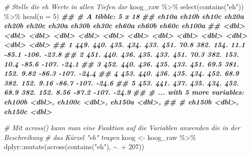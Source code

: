 \documentclass[
]{article}
\newenvironment{Shaded}{\begin{snugshade}}{\end{snugshade}}
\newcommand{\AttributeTok}[1]{\textcolor[rgb]{0.77,0.63,0.00}{#1}}
\newcommand{\CommentTok}[1]{\textcolor[rgb]{0.56,0.35,0.01}{\textit{#1}}}
\newcommand{\DecValTok}[1]{\textcolor[rgb]{0.00,0.00,0.81}{#1}}
\newcommand{\DocumentationTok}[1]{\textcolor[rgb]{0.56,0.35,0.01}{\textbf{\textit{#1}}}}
\newcommand{\FunctionTok}[1]{\textcolor[rgb]{0.00,0.00,0.00}{#1}}
\newcommand{\NormalTok}[1]{#1}
\newcommand{\OtherTok}[1]{\textcolor[rgb]{0.56,0.35,0.01}{#1}}
\newcommand{\SpecialCharTok}[1]{\textcolor[rgb]{0.00,0.00,0.00}{#1}}
\newcommand{\StringTok}[1]{\textcolor[rgb]{0.31,0.60,0.02}{#1}}
\begin{document}
\begin{Shaded}
\begin{Highlighting}[]
\CommentTok{\# Stelle die eh Werte in allen Tiefen dar}
\NormalTok{koog\_raw }\SpecialCharTok{\%\textgreater{}\%}
  \FunctionTok{select}\NormalTok{(}\FunctionTok{contains}\NormalTok{(}\StringTok{"eh"}\NormalTok{)) }\SpecialCharTok{\%\textgreater{}\%}
  \FunctionTok{head}\NormalTok{(}\AttributeTok{n =} \DecValTok{5}\NormalTok{)}
\DocumentationTok{\#\# \# A tibble: 5 x 18}
\DocumentationTok{\#\#   eh10a eh10b eh10c eh20a eh20b eh20c eh30a eh30b eh30c eh60a eh60b eh60c eh100a}
\DocumentationTok{\#\#   \textless{}dbl\textgreater{} \textless{}dbl\textgreater{} \textless{}dbl\textgreater{} \textless{}dbl\textgreater{} \textless{}dbl\textgreater{} \textless{}dbl\textgreater{} \textless{}dbl\textgreater{} \textless{}dbl\textgreater{} \textless{}dbl\textgreater{} \textless{}dbl\textgreater{} \textless{}dbl\textgreater{} \textless{}dbl\textgreater{}  \textless{}dbl\textgreater{}}
\DocumentationTok{\#\# 1  449.  440.  435.  434.  433.  451.  70.8  382.  154. 11.1  {-}85.1 {-}106.  {-}23.8}
\DocumentationTok{\#\# 2  451.  440.  436.  435.  433.  451.  70.3  382.  153. 10.4  {-}85.6 {-}107.  {-}24.1}
\DocumentationTok{\#\# 3  452.  440.  436.  435.  433.  451.  69.5  381.  152.  9.82 {-}86.3 {-}107.  {-}24.4}
\DocumentationTok{\#\# 4  453.  440.  436.  435.  434.  452.  68.9  382.  152.  9.16 {-}86.7 {-}107.  {-}24.6}
\DocumentationTok{\#\# 5  453.  441.  437.  435.  434.  452.  68.9  382.  152.  8.56 {-}87.2 {-}107.  {-}24.9}
\DocumentationTok{\#\# \# ... with 5 more variables: eh100b \textless{}dbl\textgreater{}, eh100c \textless{}dbl\textgreater{}, eh150a \textless{}dbl\textgreater{},}
\DocumentationTok{\#\# \#   eh150b \textless{}dbl\textgreater{}, eh150c \textless{}dbl\textgreater{}}

\CommentTok{\# Mit across() kann man eine Funktion auf die Variablen anwenden die in der Beschreibung}
\CommentTok{\# das Kürzel "eh" tragen}
\NormalTok{koog }\OtherTok{\textless{}{-}}\NormalTok{ koog\_raw }\SpecialCharTok{\%\textgreater{}\%}
\NormalTok{  dplyr}\SpecialCharTok{::}\FunctionTok{mutate}\NormalTok{(}\FunctionTok{across}\NormalTok{(}\FunctionTok{contains}\NormalTok{(}\StringTok{"eh"}\NormalTok{), }\SpecialCharTok{\textasciitilde{}}\NormalTok{. }\SpecialCharTok{+} \DecValTok{207}\NormalTok{)) }


\end{Highlighting}
\end{Shaded}
\end{document}
